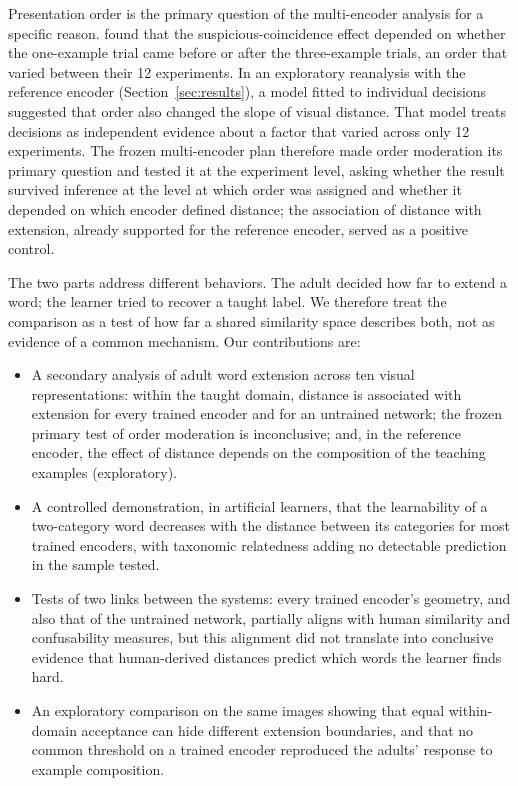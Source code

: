 \documentclass[11pt]{article}
\begin{document}
Presentation order is the primary question of the multi-encoder analysis for a specific reason. \textcite{lewis2018} found that the suspicious-coincidence effect depended on whether the one-example trial came before or after the three-example trials, an order that varied between their 12 experiments. In an exploratory reanalysis with the reference encoder (Section~\ref{sec:results}), a model fitted to individual decisions suggested that order also changed the slope of visual distance. That model treats \OrdNobs{} decisions as independent evidence about a factor that varied across only 12 experiments. The frozen multi-encoder plan therefore made order moderation its primary question and tested it at the experiment level, asking whether the result survived inference at the level at which order was assigned and whether it depended on which encoder defined distance; the association of distance with extension, already supported for the reference encoder, served as a positive control.

The two parts address different behaviors. The adult decided how far to extend a word; the learner tried to recover a taught label. We therefore treat the comparison as a test of how far a shared similarity space describes both, not as evidence of a common mechanism. Our contributions are:
\begin{itemize}
\item A secondary analysis of adult word extension across ten visual representations: within the taught domain, distance is associated with extension for every trained encoder and for an untrained network; the frozen primary test of order moderation is inconclusive; and, in the reference encoder, the effect of distance depends on the composition of the teaching examples (exploratory).
\item A controlled demonstration, in artificial learners, that the learnability of a two-category word decreases with the distance between its categories for most trained encoders, with taxonomic relatedness adding no detectable prediction in the sample tested.
\item Tests of two links between the systems: every trained encoder's geometry, and also that of the untrained network, partially aligns with human similarity and confusability measures, but this alignment did not translate into conclusive evidence that human-derived distances predict which words the learner finds hard.
\item An exploratory comparison on the same images showing that equal within-domain acceptance can hide different extension boundaries, and that no common threshold on a trained encoder reproduced the adults' response to example composition.
\end{itemize}
\end{document}
